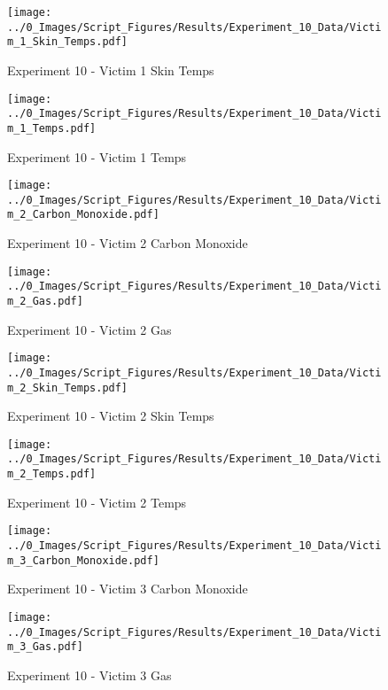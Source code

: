 	\begin{figure}[H]
		\centering
		\texttt{[image: ../0\_Images/Script\_Figures/Results/Experiment\_10\_Data/Victim\_1\_Skin\_Temps.pdf]}
		\caption[]{Experiment 10 - Victim 1 Skin Temps}
	\end{figure}
 
	\clearpage

	\begin{figure}[H]
		\centering
		\texttt{[image: ../0\_Images/Script\_Figures/Results/Experiment\_10\_Data/Victim\_1\_Temps.pdf]}
		\caption[]{Experiment 10 - Victim 1 Temps}
	\end{figure}
 

	\begin{figure}[H]
		\centering
		\texttt{[image: ../0\_Images/Script\_Figures/Results/Experiment\_10\_Data/Victim\_2\_Carbon\_Monoxide.pdf]}
		\caption[]{Experiment 10 - Victim 2 Carbon Monoxide}
	\end{figure}
 
	\clearpage

	\begin{figure}[H]
		\centering
		\texttt{[image: ../0\_Images/Script\_Figures/Results/Experiment\_10\_Data/Victim\_2\_Gas.pdf]}
		\caption[]{Experiment 10 - Victim 2 Gas}
	\end{figure}
 

	\begin{figure}[H]
		\centering
		\texttt{[image: ../0\_Images/Script\_Figures/Results/Experiment\_10\_Data/Victim\_2\_Skin\_Temps.pdf]}
		\caption[]{Experiment 10 - Victim 2 Skin Temps}
	\end{figure}
 
	\clearpage

	\begin{figure}[H]
		\centering
		\texttt{[image: ../0\_Images/Script\_Figures/Results/Experiment\_10\_Data/Victim\_2\_Temps.pdf]}
		\caption[]{Experiment 10 - Victim 2 Temps}
	\end{figure}
 

	\begin{figure}[H]
		\centering
		\texttt{[image: ../0\_Images/Script\_Figures/Results/Experiment\_10\_Data/Victim\_3\_Carbon\_Monoxide.pdf]}
		\caption[]{Experiment 10 - Victim 3 Carbon Monoxide}
	\end{figure}
 
	\clearpage

	\begin{figure}[H]
		\centering
		\texttt{[image: ../0\_Images/Script\_Figures/Results/Experiment\_10\_Data/Victim\_3\_Gas.pdf]}
		\caption[]{Experiment 10 - Victim 3 Gas}
	\end{figure}
 

